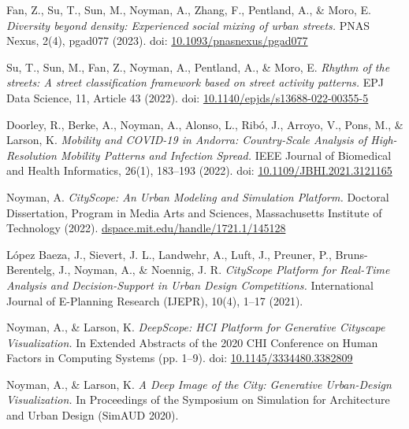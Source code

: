 \begin{tablist}
    \item[2023] \tab
    Fan, Z., Su, T., Sun, M., Noyman, A., Zhang, F., Pentland, A., \& Moro, E.
    \textit{Diversity beyond density: Experienced social mixing of urban streets.}
    PNAS Nexus, 2(4), pgad077 (2023).
    doi: \href{https://doi.org/10.1093/pnasnexus/pgad077}{10.1093/pnasnexus/pgad077}

    \item[2022] \tab
    Su, T., Sun, M., Fan, Z., Noyman, A., Pentland, A., \& Moro, E.
    \textit{Rhythm of the streets: A street classification framework based on street activity patterns.}
    EPJ Data Science, 11, Article 43 (2022).
    doi: \href{https://doi.org/10.1140/epjds/s13688-022-00355-5}{10.1140/epjds/s13688-022-00355-5}

    \item[2022] \tab
    Doorley, R., Berke, A., Noyman, A., Alonso, L., Ribó, J., Arroyo, V., Pons, M., \& Larson, K.
    \textit{Mobility and COVID-19 in Andorra: Country-Scale Analysis of High-Resolution Mobility Patterns and Infection Spread.}
    IEEE Journal of Biomedical and Health Informatics, 26(1), 183--193 (2022).
    doi: \href{https://doi.org/10.1109/JBHI.2021.3121165}{10.1109/JBHI.2021.3121165}

    \item[2022] \tab
    Noyman, A.
    \textit{CityScope: An Urban Modeling and Simulation Platform.}
    Doctoral Dissertation, Program in Media Arts and Sciences, Massachusetts Institute of Technology (2022).
    \href{https://dspace.mit.edu/handle/1721.1/145128}{dspace.mit.edu/handle/1721.1/145128}

    \item[2021] \tab
    López Baeza, J., Sievert, J. L., Landwehr, A., Luft, J., Preuner, P., Bruns-Berentelg, J., Noyman, A., \& Noennig, J. R.
    \textit{CityScope Platform for Real-Time Analysis and Decision-Support in Urban Design Competitions.}
    International Journal of E-Planning Research (IJEPR), 10(4), 1--17 (2021).

    \item[2020] \tab
    Noyman, A., \& Larson, K.
    \textit{DeepScope: HCI Platform for Generative Cityscape Visualization.}
    In Extended Abstracts of the 2020 CHI Conference on Human Factors in Computing Systems (pp. 1--9).
    doi: \href{https://doi.org/10.1145/3334480.3382809}{10.1145/3334480.3382809}

    \item[2020] \tab
    Noyman, A., \& Larson, K.
    \textit{A Deep Image of the City: Generative Urban-Design Visualization.}
    In Proceedings of the Symposium on Simulation for Architecture and Urban Design (SimAUD 2020).


\end{tablist}
